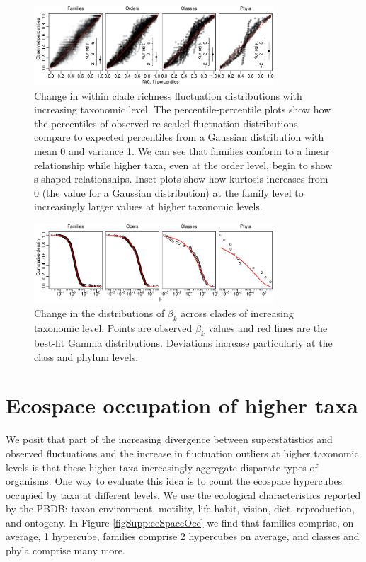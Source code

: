 \documentclass[12pt]{article}
\let\citep=\cite
\begin{document}
\begin{figure}[!hp]
  \centering
  \includegraphics[width=0.8\textwidth]{../../figSupp_pkx_allTaxa.pdf}
  \caption{Change in within clade richness fluctuation distributions
    with increasing taxonomic level. The percentile-percentile plots
    show how the percentiles of observed re-scaled fluctuation
    distributions compare to expected percentiles from a Gaussian
    distribution with mean 0 and variance 1. We can see that families
    conform to a linear relationship while higher taxa, even at the
    order level, begin to show s-shaped relationships. Inset plots
    show how kurtosis increases from 0 (the value for a Gaussian
    distribution) at the family level to increasingly larger values
    at higher taxonomic levels.}
  \label{figSupp:pkx_allTaxa}
\end{figure}

\begin{figure}[!hp]
  \centering
  \includegraphics[width=0.8\textwidth]{../../figSupp_fbeta_allTaxa.pdf}
  \caption{Change in the distributions of $\beta_k$ across clades of
    increasing taxonomic level. Points are observed $\beta_k$ values
    and red lines are the best-fit Gamma distributions. Deviations
    increase particularly at the class and phylum levels.}
  \label{figSupp:fbeta_allTaxa}
\end{figure}


\section{Ecospace occupation of higher taxa}
\label{sec:suppGuilds} 

We posit that part of the increasing divergence between
superstatistics and observed fluctuations and the increase in
fluctuation outliers at higher taxonomic levels is that these higher
taxa increasingly aggregate disparate types of organisms. One way to
evaluate this idea is to count the ecospace hypercubes
\citep{bambach1983, bambach2007, bush2007} occupied by taxa at
different levels. We use the ecological characteristics reported by
the PBDB: taxon environment, motility, life habit, vision, diet,
reproduction, and ontogeny. In Figure \ref{figSupp:eeSpaceOcc} we find
that families comprise, on average, 1 hypercube, families comprise 2
hypercubes on average, and classes and phyla comprise many more.
\end{document}
